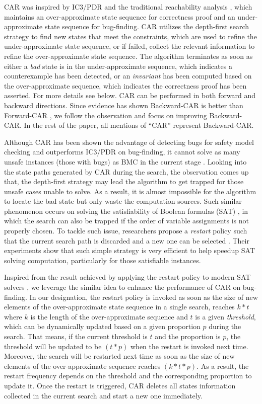 CAR was inspired by IC3/PDR and the traditional reachability analysis \cite{}, which maintains an over-approximate state sequence for correctness proof and an under-approximate state sequence for bug-finding. CAR utilizes the depth-first search strategy to find new states that meet the constraints, which are used to refine the under-approximate state sequence, or if failed, collect the relevant  information to refine the over-approximate state sequence. The algorithm terminates as soon as either a \emph{bad} state is in the under-approximate sequence, which indicates a counterexample has been detected, or an \emph{invariant} has been computed based on the over-approximate sequence, which indicates the correctness proof has been asserted.  For more details see below. CAR can be performed in both forward and backward directions. Since evidence has shown Backward-CAR is better than Forward-CAR \cite{}, we follow the observation and focus on improving Backward-CAR. In the rest of the paper, all mentions of ``CAR'' represent Backward-CAR. 

Although CAR has been shown the advantage of detecting bugs for safety model checking and outperforms IC3/PDR on bug-finding, it cannot solve as many unsafe instances (those with bugs) as BMC in the current stage \cite{}. Looking into the state paths generated by CAR during the search, the observation comes up that, the depth-first strategy may lead the algorithm to get trapped for those unsafe cases unable to solve. As a result, it is almost impossible for the algorithm to locate the bad state but only waste the computation sources. Such similar phenomenon occurs on solving the satisfiability of Boolean formulas (SAT) \cite{}, in which the search can also be trapped if the order of variable assignments is not properly chosen. To tackle such issue, researchers propose a \emph{restart} policy such that the current search path is discarded and a new one can be selected \cite{}. Their experiments show that such simple strategy is very efficient to help speedup  SAT solving computation, particularly for those satisfiable instances. 

Inspired from the result achieved by applying the restart policy to modern SAT solvers \cite{b4}\cite{b5}, we leverage the similar idea to enhance the performance of CAR on bug-finding. In our designation, the restart policy is invoked as soon as the size of new elements of the over-approximate state sequence in a single search, reaches $k*t$ where $k$ is the length of the over-approximate sequence and $t$ is a given  \emph{threshold}, which can be dynamically updated based on a given proportion $p$ during the search. That means, if the current threshold is $t$ and the proportion is $p$, the threshold will be updated to be $(t*p)$ when the restart is invoked next time. Moreover, the search will be restarted next time as soon as the size of new elements of the over-approximate sequence reaches $(k*t*p)$. As a result, the restart frequency depends on the threshold and the corresponding proportion to update it. Once the restart is triggered, CAR deletes all states information collected in the current search and start a new one immediately. 

